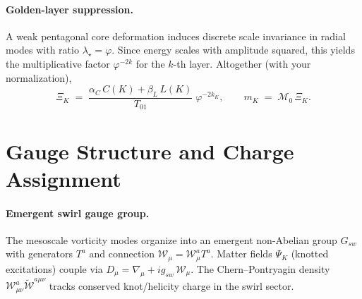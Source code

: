 \documentclass[11pt, preprint,titlepage]{revtex4-2}
\begin{document}
	\paragraph*{Golden-layer suppression.}
	A weak pentagonal core deformation induces discrete scale invariance in radial modes with ratio \(\lambda_\star=\varphi\).
	Since energy scales with amplitude squared, this yields the multiplicative factor \(\varphi^{-2k}\) for the \(k\)-th layer.
	Altogether (with your normalization),
	\begin{equation}
		\Xi_K \;=\; \frac{\alpha_C\,C(K)+\beta_{\!L}\,L(K)}{T_{01}}\;\varphi^{-2k_K},
		\qquad
		m_K \;=\; \mathcal{M}_0\,\Xi_K .
	\end{equation}


	\section{Gauge Structure and Charge Assignment}

	\paragraph{Emergent swirl gauge group.}
	The mesoscale vorticity modes organize into an emergent non-Abelian group \(G_{\!sw}\) with generators \(T^a\) and connection \(\mathcal{W}_\mu=\mathcal{W}_\mu^a T^a\).
	Matter fields \(\Psi_K\) (knotted excitations) couple via \(D_\mu=\nabla_\mu+i g_{\!sw}\,\mathcal{W}_\mu\).
	The Chern–Pontryagin density \(\mathcal{W}_{\mu\nu}^a\tilde{\mathcal{W}}^{a\mu\nu}\) tracks conserved knot/helicity charge in the swirl sector.
\end{document}

